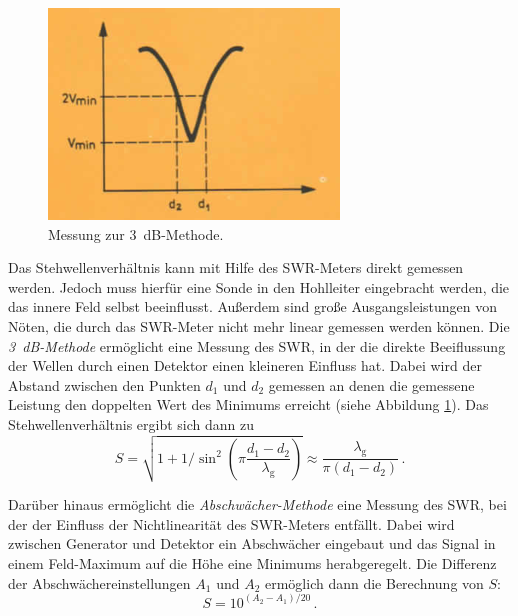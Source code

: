 \begin{figure}
    \centering
    \includegraphics[width=0.9\linewidth]{img/3db.png}
    \caption{
        Messung zur \SI{3}{dB}-Methode.
    }
    \label{fig:3db}
\end{figure}
Das Stehwellenverhältnis kann mit Hilfe des SWR-Meters direkt gemessen werden.
Jedoch muss hierfür eine Sonde in den Hohlleiter eingebracht werden, die
das innere Feld selbst beeinflusst.
Außerdem sind große Ausgangsleistungen von Nöten, die durch das SWR-Meter
nicht mehr linear gemessen werden können.
Die \emph{\SI{3}{dB}-Methode} ermöglicht eine Messung des SWR, in der die
direkte Beeiflussung der Wellen durch einen Detektor einen kleineren Einfluss
hat.
Dabei wird der Abstand zwischen den Punkten $d_1$ und $d_2$ gemessen an denen
die gemessene Leistung den doppelten Wert des Minimums erreicht
(siehe Abbildung \ref{fig:3db}).
Das Stehwellenverhältnis ergibt sich dann zu
\begin{equation}
    \label{3dbswr}
    S = \sqrt{1 + 1/\sin^2\left(\pi\frac{d_1-d_2}{\lambda_\text{g}}\right)}
    \approx \frac{\lambda_\text{g}}{\pi (d_1-d_2)}\,.
\end{equation}

Darüber hinaus ermöglicht die \emph{Abschwächer-Methode} eine Messung des
SWR, bei der der Einfluss der Nichtlinearität des SWR-Meters entfällt.
Dabei wird zwischen Generator und Detektor ein Abschwächer eingebaut und das
Signal in einem Feld-Maximum auf die Höhe eine Minimums herabgeregelt.
Die Differenz der Abschwächereinstellungen $A_1$ und $A_2$ ermöglich dann die
Berechnung von $S$:
\begin{equation}
    \label{abschwaecher}
    S = 10^{(A_2-A_1)/20}\,.
\end{equation}
\clearpage
